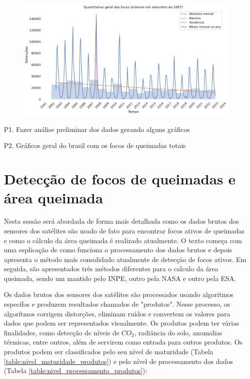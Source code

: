\documentclass[cic,tc]{iiufrgs}
\begin{document}
\begin{figure}[H]
    \caption{}
    \begin{center}
        \includegraphics[width=35em]{quantitativo_geral}
    \end{center}
    \label{fig:quantitativo_geral}
\end{figure}


P1. Fazer análise preliminar dos dados gerando alguns gráficos \par
P2. Gráficos geral do brasil com os focos de queimadas totais \cite{geographicDataSciencePython} \par


\section{Detecção de focos de queimadas e área queimada}
\label{sec:deteccao_focos_section}

Nesta sessão será abordada de forma mais detalhada como os dados brutos dos sensores dos satélites são usado de fato para encontrar focos ativos de queimadas e como o cálculo da área queimada é realizado atualmente. O texto começa com uma esplicação de como funciona o processamento dos dados brutos e depois apresenta o método mais consolidado atualmente de detecção de focos ativos. Em seguida, são apresentados três métodos diferentes para o calculo da área queimada, sendo um mantido pelo INPE, outro pela NASA e outro pela ESA. 

Os dados brutos dos sensores dos satélites são processados usando algoritmos específos e produzem resultados chamados de "produtos". Nesse processo, os algorítmos corrigem distorções, eliminam ruídos e convertem os valores para dados que podem ser representados visualmente. Os produtos podem ter várias finalidades, como detecção de níveis de $CO_2$, radiância do solo, anomalias térmicas, entre outros, além de servirem como entrada para outros produtos. Os produtos podem ser classificados pelo seu nível de maturidade (Tabela \ref{table:nivel_maturidade_produtos}) e pelo nível de processamento dos dados (Tabela \ref{table:nivel_processamento_produtos}):
\end{document}

